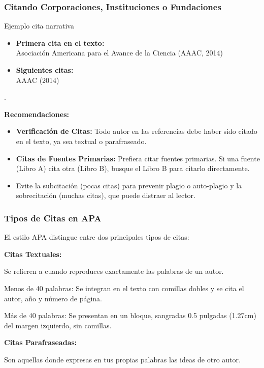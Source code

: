 \documentclass[
11pt, %
]{beamer}
\begin{document}
\begin{frame}
	\frametitle{Citando Corporaciones, Instituciones o Fundaciones}
	\begin{exampleblock}{Ejemplo cita narrativa}
		\begin{itemize}
			\item \textbf{Primera cita en el texto:} \\Asociación Americana para el Avance de la Ciencia (AAAC, 2014)
			\item \textbf{Siguientes citas:} \\ AAAC (2014)
		\end{itemize}.
	\end{exampleblock}

	\textbf{Recomendaciones:}

	\begin{itemize}
		\item \textbf{Verificación de Citas:} Todo autor en las referencias debe haber sido citado en el texto, ya sea textual o parafraseado.
	\end{itemize}

	\begin{itemize}
		\item \textbf{Citas de Fuentes Primarias:} Prefiera citar fuentes primarias. {\color{blue}Si una fuente (Libro A) cita otra (Libro B), busque el Libro B para citarlo directamente.}
	\end{itemize}

	\begin{itemize}
		\item Evite la subcitación (pocas citas) para prevenir plagio o auto-plagio y la sobrecitación (muchas citas), que puede distraer al lector.
	\end{itemize}
\end{frame}


\begin{frame}
	\frametitle{Tipos de Citas en APA}

	El estilo APA distingue entre dos principales tipos de citas:

	\textbf{Citas Textuales:}

	Se refieren a cuando reproduces exactamente las palabras de un autor.
	\begin{block}{Menos de 40 palabras:}
		Se integran en el texto con comillas dobles y se cita el autor, año y número de página.
	\end{block}
	\begin{block}{Más de 40 palabras:}
		Se presentan en un bloque, sangradas 0.5 pulgadas (1.27cm) del margen izquierdo, sin comillas.
	\end{block}

	\textbf{Citas Parafraseadas:}

	Son aquellas donde expresas en tus propias palabras las ideas de otro autor.

\end{frame}
\end{document}

